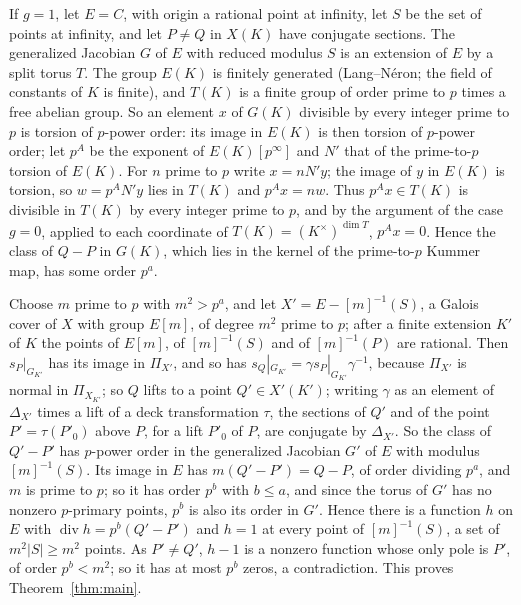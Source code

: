 \documentclass[11pt]{amsart}
\theoremstyle{remark}
\DeclareMathOperator{\divi}{div}
\begin{document}
If $g=1$, let $E=C$, with origin a rational point at infinity, let $S$ be the set of points at infinity, and let $P\ne Q$ in $X(K)$ have conjugate sections. The generalized Jacobian $G$ of $E$ with reduced modulus $S$ is an extension of $E$ by a split torus $T$. The group $E(K)$ is finitely generated (Lang--N\'eron; the field of constants of $K$ is finite), and $T(K)$ is a finite group of order prime to $p$ times a free abelian group. So an element $x$ of $G(K)$ divisible by every integer prime to $p$ is torsion of $p$-power order: its image in $E(K)$ is then torsion of $p$-power order; let $p^A$ be the exponent of $E(K)[p^\infty]$ and $N'$ that of the prime-to-$p$ torsion of $E(K)$. For $n$ prime to $p$ write $x=nN'y$; the image of $y$ in $E(K)$ is torsion, so $w=p^AN'y$ lies in $T(K)$ and $p^Ax=nw$. Thus $p^Ax\in T(K)$ is divisible in $T(K)$ by every integer prime to $p$, and by the argument of the case $g=0$, applied to each coordinate of $T(K)=(K^\times)^{\dim T}$, $p^Ax=0$. Hence the class of $Q-P$ in $G(K)$, which lies in the kernel of the prime-to-$p$ Kummer map, has some order $p^a$.

Choose $m$ prime to $p$ with $m^2>p^a$, and let $X'=E-[m]^{-1}(S)$, a Galois cover of $X$ with group $E[m]$, of degree $m^2$ prime to $p$; after a finite extension $K'$ of $K$ the points of $E[m]$, of $[m]^{-1}(S)$ and of $[m]^{-1}(P)$ are rational. Then $s_P|_{G_{K'}}$ has its image in $\Pi_{X'}$, and so has $s_Q|_{G_{K'}}=\gamma s_P|_{G_{K'}}\gamma^{-1}$, because $\Pi_{X'}$ is normal in $\Pi_{X_{K'}}$; so $Q$ lifts to a point $Q'\in X'(K')$; writing $\gamma$ as an element of $\Delta_{X'}$ times a lift of a deck transformation $\tau$, the sections of $Q'$ and of the point $P'=\tau(P'_0)$ above $P$, for a lift $P'_0$ of $P$, are conjugate by $\Delta_{X'}$. So the class of $Q'-P'$ has $p$-power order in the generalized Jacobian $G'$ of $E$ with modulus $[m]^{-1}(S)$. Its image in $E$ has $m(Q'-P')=Q-P$, of order dividing $p^a$, and $m$ is prime to $p$; so it has order $p^b$ with $b\le a$, and since the torus of $G'$ has no nonzero $p$-primary points, $p^b$ is also its order in $G'$. Hence there is a function $h$ on $E$ with $\divi h=p^b(Q'-P')$ and $h=1$ at every point of $[m]^{-1}(S)$, a set of $m^2|S|\ge m^2$ points. As $P'\ne Q'$, $h-1$ is a nonzero function whose only pole is $P'$, of order $p^b<m^2$; so it has at most $p^b$ zeros, a contradiction. This proves Theorem~\ref{thm:main}.
\end{document}
